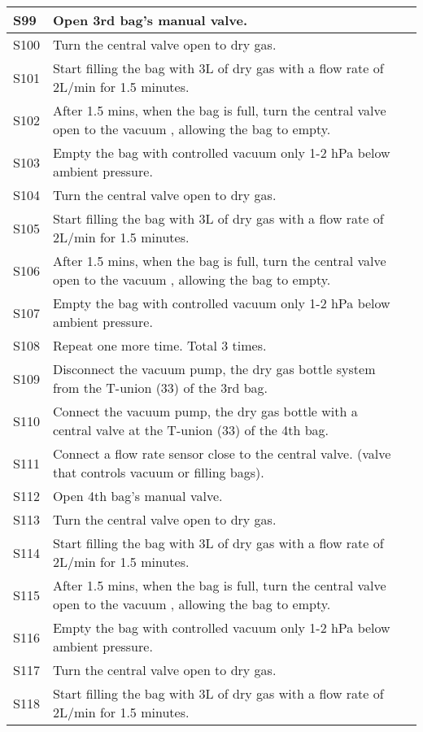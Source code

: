 \begin{longtable} {|m{}|m{}|m{}|}
S99 & Open 3rd bag's manual valve. & \\ \hline
S100 & Turn the central valve open to dry gas. & \\ \hline
S101 & Start filling the bag with 3L of dry gas with a flow rate of 2L/min for 1.5 minutes. & \\ \hline
S102 & After 1.5 mins, when the bag is full, turn the central valve open to the vacuum , allowing the bag to empty. & \\ \hline
S103 & Empty the bag with controlled vacuum only 1-2 hPa below ambient pressure. & \\ \hline
S104 & Turn the central valve open to dry gas. & \\ \hline
S105 & Start filling the bag with 3L of dry gas with a flow rate of 2L/min for 1.5 minutes. & \\ \hline
S106 & After 1.5 mins, when the bag is full, turn the central valve open to the vacuum , allowing the bag to empty. & \\ \hline
S107 & Empty the bag with controlled vacuum only 1-2 hPa below ambient pressure. & \\ \hline
S108 & Repeat one more time. Total 3 times. & \\ \hline
S109 & Disconnect the vacuum pump, the dry gas bottle system from the T-union (33) of the 3rd bag. & \\ \hline
S110 & Connect the vacuum pump, the dry gas bottle with a central valve at the T-union (33) of the 4th bag. & \\ \hline
S111 & Connect a flow rate sensor close to the central valve. (valve that controls vacuum or filling bags). & \\ \hline
S112 & Open 4th bag's manual valve. & \\ \hline
S113 & Turn the central valve open to dry gas. & \\ \hline
S114 & Start filling the bag with 3L of dry gas with a flow rate of 2L/min for 1.5 minutes. & \\ \hline
S115 & After 1.5 mins, when the bag is full, turn the central valve open to the vacuum , allowing the bag to empty. & \\ \hline
S116 & Empty the bag with controlled vacuum only 1-2 hPa below ambient pressure. & \\ \hline
S117 & Turn the central valve open to dry gas. & \\ \hline
S118 & Start filling the bag with 3L of dry gas with a flow rate of 2L/min for 1.5 minutes. & \\ \hline

\end{longtable}
